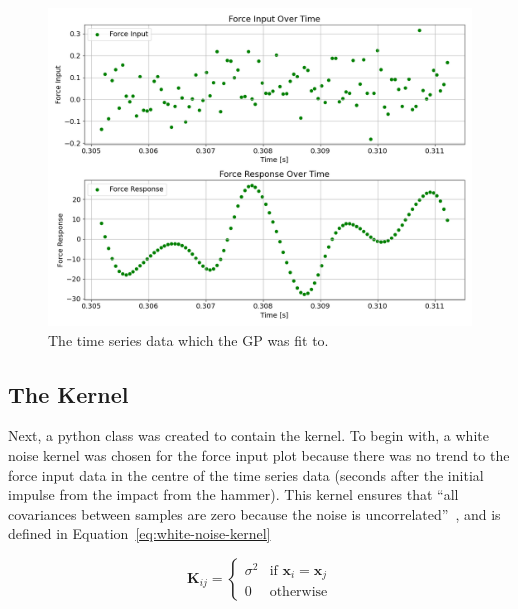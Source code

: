 \documentclass[12pt]{article}
\begin{document}
    \begin{figure}[ht]
        \centering
        \includegraphics[width=1.0\linewidth]{figures/input-response-plot/input-response-plot.png}
        \caption{The time series data which the GP was fit to.}
        \label{fig:input-response-plot}
    \end{figure}



    \subsection{The Kernel}
    Next, a python class was created to contain the kernel.
    To begin with, a white noise kernel was chosen for the force input plot because there was no trend to the force input data in the centre of the time series data (seconds after the initial impulse from the impact from the hammer).
    This kernel ensures that ``all covariances between samples are zero because the noise is uncorrelated''~\cite{RoelantsGPKernels}, and is defined in Equation~\ref{eq:white-noise-kernel}

    \begin{equation}
        \mathbf{K}_{ij} =
        \begin{cases}
            \sigma^2 & \text{if } \mathbf{x}_i = \mathbf{x}_j \\
            0 & \text{otherwise}
        \end{cases}\label{eq:white-noise-kernel}
    \end{equation}
\end{document}
